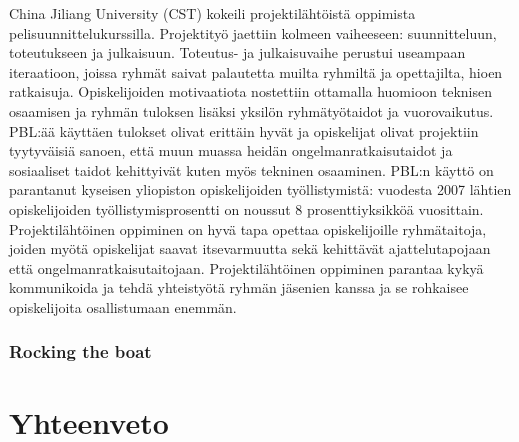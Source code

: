 \documentclass[finnish]{../tktltiki2}
\theoremstyle{definition}
\theoremstyle{remark}
\begin{document}
China Jiliang University (CST) kokeili projektilähtöistä oppimista pelisuunnittelukurssilla.
Projektityö jaettiin kolmeen vaiheeseen: suunnitteluun, toteutukseen ja julkaisuun.
Toteutus- ja julkaisuvaihe perustui useampaan iteraatioon, joissa ryhmät saivat palautetta
muilta ryhmiltä ja opettajilta, hioen ratkaisuja. Opiskelijoiden motivaatiota nostettiin
ottamalla huomioon teknisen osaamisen ja ryhmän tuloksen lisäksi yksilön ryhmätyötaidot ja
vuorovaikutus. PBL:ää käyttäen tulokset olivat erittäin hyvät ja opiskelijat olivat
projektiin tyytyväisiä sanoen, että muun muassa heidän ongelmanratkaisutaidot ja sosiaaliset
taidot kehittyivät kuten myös tekninen osaaminen. PBL:n käyttö on parantanut kyseisen
yliopiston opiskelijoiden työllistymistä: vuodesta 2007 lähtien opiskelijoiden työllistymisprosentti
on noussut 8 prosenttiyksikköä vuosittain.\\

Projektilähtöinen oppiminen on hyvä tapa opettaa opiskelijoille ryhmätai\-toja, joiden myötä
opiskelijat saavat itsevarmuutta sekä kehittävät ajattelutapojaan että ongelmanratkaisutaitojaan.
Projektilähtöinen oppiminen parantaa kykyä kommunikoida ja tehdä yhteistyötä ryhmän jäsenien kanssa
ja se rohkaisee opiskelijoita osallistumaan enemmän. 

\subsubsection{Rocking the boat}

\section{Yhteenveto}


%
%
% 
%



\end{document}
